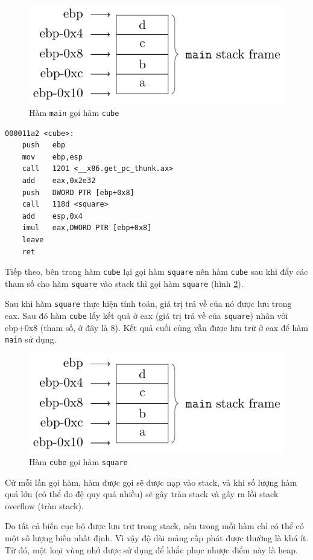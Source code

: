 \begin{figure}[ht]
    \centering
    \includegraphics[page=3]{assembly/stack.pdf}
    \caption{Hàm \texttt{main} gọi hàm \texttt{cube}}
    \label{stack:3}
\end{figure}

\begin{lstlisting}[language={[x86masm]Assembler}]
000011a2 <cube>:
    push   ebp
    mov    ebp,esp
    call   1201 <__x86.get_pc_thunk.ax>
    add    eax,0x2e32
    push   DWORD PTR [ebp+0x8]
    call   118d <square>
    add    esp,0x4
    imul   eax,DWORD PTR [ebp+0x8]
    leave  
    ret
\end{lstlisting}

Tiếp theo, bên trong hàm \texttt{cube} lại gọi hàm \texttt{square} nên hàm \texttt{cube} sau khi đẩy các tham số cho hàm \texttt{square} vào stack thì gọi hàm \texttt{square} (hình \ref{stack:4}).

Sau khi hàm \texttt{square} thực hiện tính toán, giá trị trả về của nó được lưu trong eax. Sau đó hàm \texttt{cube} lấy kết quả ở eax (giá trị trả về của \texttt{square}) nhân với ebp+0x8 (tham số, ở đây là 8). Kết quả cuối cùng vẫn được lưu trữ ở eax để hàm \texttt{main} sử dụng.

\begin{figure}[ht]
    \centering
    \includegraphics[page=4]{assembly/stack.pdf}
    \caption{Hàm \texttt{cube} gọi hàm \texttt{square}}
    \label{stack:4}
\end{figure}



Cứ mỗi lần gọi hàm, hàm được gọi sẽ được nạp vào stack, và khi số lượng hàm quá lớn (có thể do đệ quy quá nhiều) sẽ gây tràn stack và gây ra lỗi stack overflow (tràn stack).

Do tất cả biến cục bộ được lưu trữ trong stack, nên trong mỗi hàm chỉ có thể có một số lượng biến nhất định. Vì vậy độ dài mảng cấp phát được thường là khá ít. Từ đó, một loại vùng nhớ được sử dụng để khắc phục nhược điểm này là heap.